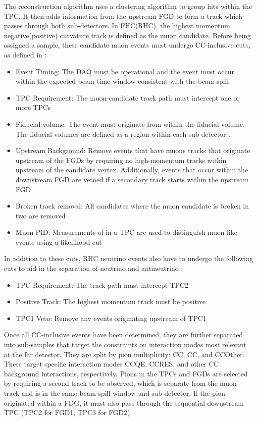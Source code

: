 The reconstruction algorithm uses a clustering algorithm to group hits within the TPC. It then adds information from the upstream FGD to form a track which passes through both sub-detectors. In FHC(RHC), the highest momentum negative(positive) curvature track is defined as the muon candidate. Before being assigned a sample, these candidate muon events must undergo CC-inclusive cuts, as defined in \cite{t2k_tn_212}:

\begin{itemize}
\item Event Timing: The DAQ must be operational and the event must occur within the expected beam time window consistent with the beam spill
\item TPC Requirement: The muon-candidate track path must intercept one or more TPCs
\item Fiducial volume: The event must originate from within the fiducial volume. The fiducial volumes are defined as a region within each sub-detector \cite{thesis_will}.
\item Upstream Background: Remove events that have muons tracks that originate upstream of the FGDs by requiring no high-momentum tracks within  upstream of the candidate vertex. Additionally, events that occur within the downstream FGD are vetoed if a secondary track starts within the upstream FGD
\item Broken track removal: All candidates where the muon candidate is broken in two are removed
\item Muon PID: Measurements of  in a TPC are used to distinguish muon-like events using a likelihood cut
\end{itemize}

In addition to these cuts, RHC neutrino events also have to undergo the following cuts to aid in the separation of neutrino and antineutrino \cite{t2k_tn_246}:

\begin{itemize}
\item TPC Requirement: The track path must intercept TPC2
\item Positive Track: The highest momentum track must be positive
\item TPC1 Veto: Remove any events originating upstream of TPC1
\end{itemize}

Once all CC-inclusive events have been determined, they are further separated into sub-samples that target the constraints on interaction modes most relevant at the far detector. They are split by pion multiplicity: CC\quickmath{0\pi}, CC\quickmath{1\pi}, and CCOther. These target specific interaction modes CCQE, CCRES, and other CC background interactions, respectively. Pions in the TPCs and FGDs are selected by requiring a second track to be observed, which is separate from the muon track and is in the same beam spill window and sub-detector. If the pion originated within a FDG, it must also pass through the sequential downstream TPC (TPC2 for FGD1, TPC3 for FGD2). 

